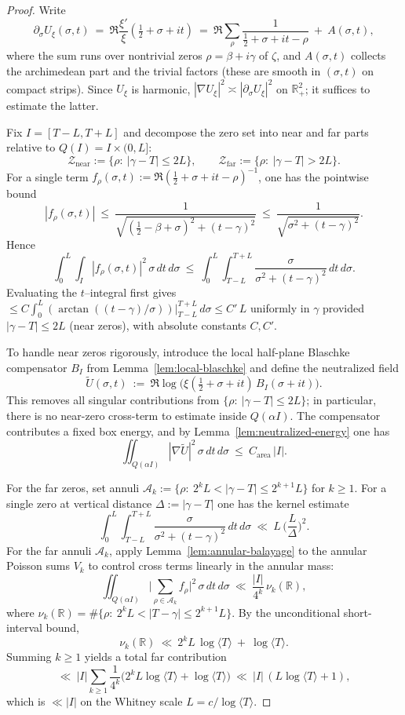 \documentclass[11pt]{article}
\theoremstyle{definition}
\theoremstyle{remark}
\newcommand{\R}{\mathbb{R}}
\begin{document}
\begin{proof}
Write
\[
 \partial_\sigma U_{\xi}(\sigma,t)\ =\ \Re\frac{\xi'}{\xi}\!\left(\tfrac12+\sigma+it\right)
 \ =\ \Re\sum_{\rho}\frac{1}{\tfrac12+\sigma+it-\rho}\ +\ A(\sigma,t),
\]
where the sum runs over nontrivial zeros $\rho=\beta+i\gamma$ of $\zeta$, and $A(\sigma,t)$ collects the archimedean part and the trivial factors (these are smooth in $(\sigma,t)$ on compact strips). Since $U_{\xi}$ is harmonic, $|\nabla U_{\xi}|^2\asymp |\partial_\sigma U_{\xi}|^2$ on $\R^2_+$; it suffices to estimate the latter.

Fix $I=[T-L,T+L]$ and decompose the zero set into near and far parts relative to $Q(I)=I\times(0,L]$:
\[
 \mathcal Z_{\mathrm{near}}:=\{\rho:\ |\gamma-T|\le 2L\},\qquad \mathcal Z_{\mathrm{far}}:=\{\rho:\ |\gamma-T|>2L\}.
\]
For a single term $f_{\rho}(\sigma,t):=\Re(\tfrac12+\sigma+it-\rho)^{-1}$, one has the pointwise bound
\[ |f_{\rho}(\sigma,t)|\ \le\ \frac{1}{\sqrt{(\tfrac12-\beta+\sigma)^2+(t-\gamma)^2}}\ \le\ \frac{1}{\sqrt{\sigma^2+(t-\gamma)^2}}. \]
Hence
\[
 \int_0^{L}\!\int_{I} |f_{\rho}(\sigma,t)|^2\,\sigma\,dt\,d\sigma\ \le\ \int_0^{L}\!\int_{T-L}^{T+L}\frac{\sigma}{\sigma^2+(t-\gamma)^2}\,dt\,d\sigma.
\]
Evaluating the $t$–integral first gives $\le C\int_0^{L} (\arctan((t-\gamma)/\sigma))\big|_{T-L}^{T+L}\,d\sigma\le C'\,L$ uniformly in $\gamma$ provided $|\gamma-T|\le 2L$ (near zeros), with absolute constants $C,C'$.

To handle near zeros rigorously, introduce the local half-plane Blaschke compensator $B_I$ from Lemma~\ref{lem:local-blaschke} and define the neutralized field
\[
  \widetilde U(\sigma,t)\ :=\ \Re\log\big(\xi(\tfrac12+\sigma+it)\,B_I(\sigma+it)\big).
\]
This removes all singular contributions from $\{\rho:\ |\gamma-T|\le 2L\}$; in particular, there is no near-zero cross-term to estimate inside $Q(\alpha I)$. The compensator contributes a fixed box energy, and by Lemma~\ref{lem:neutralized-energy} one has
\[
  \iint_{Q(\alpha I)} |\nabla \widetilde U|^2\,\sigma\,dt\,d\sigma\ \le\ C_{\mathrm{area}}\,|I|.
\]

For the far zeros, set annuli $\mathcal A_k:=\{\rho:\ 2^kL<|\gamma-T|\le 2^{k+1}L\}$ for $k\ge1$. For a single zero at vertical distance $\Delta:=|\gamma-T|$ one has the kernel estimate
\[
 \int_0^{L}\!\int_{T-L}^{T+L} \frac{\sigma}{\sigma^2+(t-\gamma)^2}\,dt\,d\sigma\ \ll\ L\,\Big(\frac{L}{\Delta}\Big)^{\!2}.
\]
For the far annuli $\mathcal A_k$, apply Lemma~\ref{lem:annular-balayage} to the annular Poisson sums $V_k$ to control cross terms linearly in the annular mass:
\[
  \iint_{Q(\alpha I)}\Big|\sum_{\rho\in\mathcal A_k} f_{\rho}\Big|^2\,\sigma\,dt\,d\sigma\ \ll\ \frac{|I|}{4^k}\,\nu_k(\R),
\]
where $\nu_k(\R)=\#\{\rho:\ 2^kL<|T-\gamma|\le 2^{k+1}L\}$. By the unconditional short-interval bound,
\[ \nu_k(\R)\ \ll\ 2^kL\,\log\langle T\rangle\ +\ \log\langle T\rangle. \]
Summing $k\ge1$ yields a total far contribution
\[ \ll\ |I|\sum_{k\ge1}\frac{1}{4^k}\big(2^kL\log\langle T\rangle+\log\langle T\rangle\big)\ \ll\ |I|\,(L\log\langle T\rangle+1), \]
which is $\ll |I|$ on the Whitney scale $L=c/\log\langle T\rangle$.


\end{proof}
\end{document}
